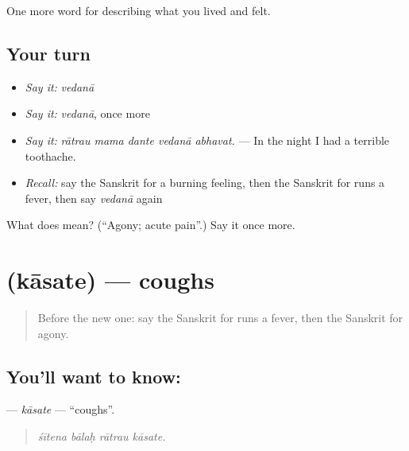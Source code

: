 \begin{grammarlens}[title={What you've built}]
One more word for describing what you lived and felt.
\end{grammarlens}

\subsection*{Your turn}
\begin{itemize}
\raggedright
  \item \emph{Say it:} \emph{vedanā}
  \item \emph{Say it:} \emph{vedanā}, once more
  \item \emph{Say it:} \emph{rātrau mama dante vedanā abhavat.} — In the night I had a terrible toothache.
  \item \emph{Recall:} say the Sanskrit for a burning feeling, then the Sanskrit for runs a fever, then say \emph{vedanā} again
\end{itemize}

\begin{tcolorbox}[breakable,colback=teal!4,colframe=teal!35!black,title={Before you move on}]
What does  mean? (\textquotedblleft{}Agony; acute pain\textquotedblright{}.) Say it once more.
\end{tcolorbox}
\section[\texorpdfstring{\sk{कासते} (kāsate)}{कासते (kāsate)}]{ (kāsate) — coughs}

\label{lesson:SA-C478-kasate}



\begin{quote}
Before the new one: say the Sanskrit for runs a fever, then the Sanskrit for agony.
\end{quote}

\subsection*{You'll want to know: }
\textbf{} — \emph{kāsate} — \textquotedblleft{}coughs\textquotedblright{}.

\begin{quote}
   
\end{quote}

\begin{quote}
\emph{śītena bālaḥ rātrau kāsate.}
\end{quote}

